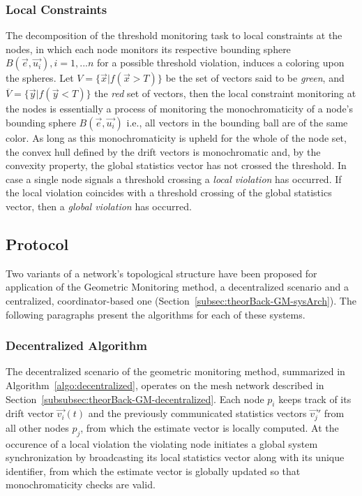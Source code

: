 \subsubsection{Local Constraints} \label{subsubsec:theorBack-GM-localConstraints}

The decomposition of the threshold monitoring task to local constraints at the nodes, in which each node monitors its respective bounding sphere $B(\vec{e}, \vec{u_i}), i=1,...n$ for a possible threshold violation, induces a coloring upon the spheres. Let $V=\{\vec{x} | f(\vec{x}>T)\}$ be the set of vectors said to be \emph{green}, and $\overline{V}=\{\vec{y} | f(\vec{y}<T)\}$ the \emph{red} set of vectors, then the local constraint monitoring at the nodes is essentially a process of monitoring the monochromaticity of a node's bounding sphere $B(\vec{e}, \vec{u_i})$ i.e., all vectors in the bounding ball are of the same color. As long as this monochromaticity is upheld for the whole of the node set, the convex hull defined by the drift vectors is monochromatic and, by the convexity property, the global statistics vector has not crossed the threshold. In case a single node signals a threshold crossing a \emph{local violation} has occurred. If the local violation coincides with a threshold crossing of the global statistics vector, then a \emph{global violation} has occurred.

\subsection{Protocol} \label{subsec:theorBack-GM-protocol}

Two variants of a network's topological structure have been proposed for application of the Geometric Monitoring method, a decentralized scenario and a centralized, coordinator-based one (Section~\ref{subsec:theorBack-GM-sysArch}). The following paragraphs present the algorithms for each of these systems.

\subsubsection{Decentralized Algorithm} \label{subsubsec:theorBack-GM-decentralizedAlgo}

The decentralized scenario of the geometric monitoring method, summarized in Algorithm~\ref{algo:decentralized}, operates on the mesh network described in Section~\ref{subsubsec:theorBack-GM-decentralized}. Each node $p_i$ keeps track of its drift vector $\vec{v_i}(t)$ and the previously communicated statistics vectors $\vec{v_j}'$ from all other nodes $p_j$, from which the estimate vector is locally computed. At the occurence of a local violation the violating node initiates a global system synchronization by broadcasting its local statistics vector along with its unique identifier, from which the estimate vector is globally updated so that monochromaticity checks are valid.\\ 

